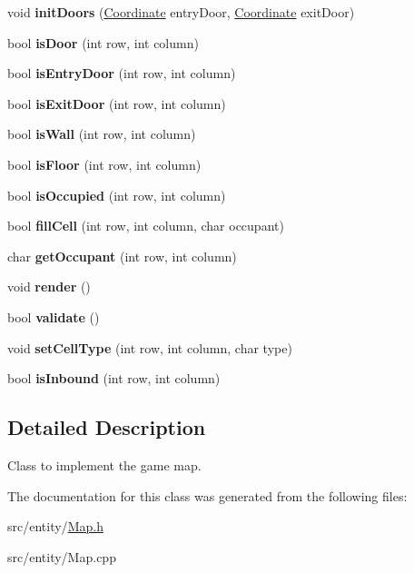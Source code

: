 \begin{DoxyCompactItemize}
\hypertarget{classMap_ad06345e2fda83141117cf2260623b51f}{}\label{classMap_ad06345e2fda83141117cf2260623b51f} 
void {\bfseries init\+Doors} (\hyperlink{structCoordinate}{Coordinate} entry\+Door, \hyperlink{structCoordinate}{Coordinate} exit\+Door)
\item 
\hypertarget{classMap_ab8f7b8df6f5cfd061e37ceffefdad8c0}{}\label{classMap_ab8f7b8df6f5cfd061e37ceffefdad8c0} 
bool {\bfseries is\+Door} (int row, int column)
\item 
\hypertarget{classMap_ac00d085ca1148f6d8c282fbc85a38f71}{}\label{classMap_ac00d085ca1148f6d8c282fbc85a38f71} 
bool {\bfseries is\+Entry\+Door} (int row, int column)
\item 
\hypertarget{classMap_a6c85e5a96ec1e13c86b30a5054e2e260}{}\label{classMap_a6c85e5a96ec1e13c86b30a5054e2e260} 
bool {\bfseries is\+Exit\+Door} (int row, int column)
\item 
\hypertarget{classMap_a6dfb55208049862a7f66b177f6861878}{}\label{classMap_a6dfb55208049862a7f66b177f6861878} 
bool {\bfseries is\+Wall} (int row, int column)
\item 
\hypertarget{classMap_a6101fc8e14be52dba55b00584a8f0a1e}{}\label{classMap_a6101fc8e14be52dba55b00584a8f0a1e} 
bool {\bfseries is\+Floor} (int row, int column)
\item 
\hypertarget{classMap_aa088c6b9eb1ecfee30836e3046aee0db}{}\label{classMap_aa088c6b9eb1ecfee30836e3046aee0db} 
bool {\bfseries is\+Occupied} (int row, int column)
\item 
\hypertarget{classMap_ac303e5d0077a39a04855309df364d3fb}{}\label{classMap_ac303e5d0077a39a04855309df364d3fb} 
bool {\bfseries fill\+Cell} (int row, int column, char occupant)
\item 
\hypertarget{classMap_ad4279b4ede306ee50726ad391f35894c}{}\label{classMap_ad4279b4ede306ee50726ad391f35894c} 
char {\bfseries get\+Occupant} (int row, int column)
\item 
\hypertarget{classMap_a3be698445324a0d0e18b49d0730b9bea}{}\label{classMap_a3be698445324a0d0e18b49d0730b9bea} 
void {\bfseries render} ()
\item 
\hypertarget{classMap_a1e9b663a93c89e7775c66f5cb1b80573}{}\label{classMap_a1e9b663a93c89e7775c66f5cb1b80573} 
bool {\bfseries validate} ()
\item 
\hypertarget{classMap_a1b1fd198fc27787115aae3112e7bb5f1}{}\label{classMap_a1b1fd198fc27787115aae3112e7bb5f1} 
void {\bfseries set\+Cell\+Type} (int row, int column, char type)
\item 
\hypertarget{classMap_a6269d92c3dbdfddf220665beed78adae}{}\label{classMap_a6269d92c3dbdfddf220665beed78adae} 
bool {\bfseries is\+Inbound} (int row, int column)
\end{DoxyCompactItemize}


\subsection{Detailed Description}
Class to implement the game map. 

The documentation for this class was generated from the following files\+:\begin{DoxyCompactItemize}
\item 
src/entity/\hyperlink{Map_8h}{Map.\+h}\item 
src/entity/Map.\+cpp\end{DoxyCompactItemize}
